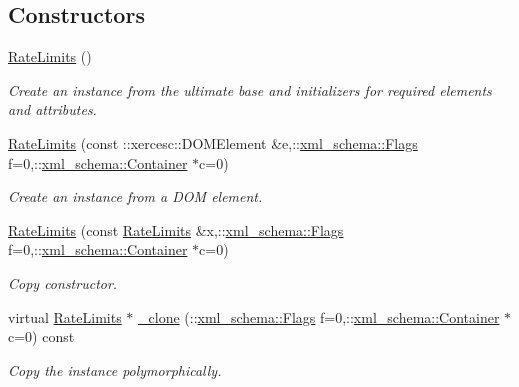 \subsection*{Constructors}
\begin{DoxyCompactItemize}
\item 
\hypertarget{classopenstack_1_1xml_1_1RateLimits_a8049d12bffabf9e47b02c86bde2fa540}{
\hyperlink{classopenstack_1_1xml_1_1RateLimits_a8049d12bffabf9e47b02c86bde2fa540}{RateLimits} ()}
\label{classopenstack_1_1xml_1_1RateLimits_a8049d12bffabf9e47b02c86bde2fa540}

\begin{DoxyCompactList}\small\item\em Create an instance from the ultimate base and initializers for required elements and attributes. \item\end{DoxyCompactList}\item 
\hyperlink{classopenstack_1_1xml_1_1RateLimits_a4547ecf1b92a698a730b5bb4e35c4564}{RateLimits} (const ::xercesc::DOMElement \&e,::\hyperlink{namespacexml__schema_affb4c227cbd9aa7453dd1dc5a1401943}{xml\_\-schema::Flags} f=0,::\hyperlink{namespacexml__schema_a333dea2213742aea47a37532dec4ec27}{xml\_\-schema::Container} $\ast$c=0)
\begin{DoxyCompactList}\small\item\em Create an instance from a DOM element. \item\end{DoxyCompactList}\item 
\hyperlink{classopenstack_1_1xml_1_1RateLimits_aa11864d4d45c735470871bf01b01ec88}{RateLimits} (const \hyperlink{classopenstack_1_1xml_1_1RateLimits}{RateLimits} \&x,::\hyperlink{namespacexml__schema_affb4c227cbd9aa7453dd1dc5a1401943}{xml\_\-schema::Flags} f=0,::\hyperlink{namespacexml__schema_a333dea2213742aea47a37532dec4ec27}{xml\_\-schema::Container} $\ast$c=0)
\begin{DoxyCompactList}\small\item\em Copy constructor. \item\end{DoxyCompactList}\item 
virtual \hyperlink{classopenstack_1_1xml_1_1RateLimits}{RateLimits} $\ast$ \hyperlink{classopenstack_1_1xml_1_1RateLimits_a4bc0af206771287f05f1a44ee6c34535}{\_\-clone} (::\hyperlink{namespacexml__schema_affb4c227cbd9aa7453dd1dc5a1401943}{xml\_\-schema::Flags} f=0,::\hyperlink{namespacexml__schema_a333dea2213742aea47a37532dec4ec27}{xml\_\-schema::Container} $\ast$c=0) const 
\begin{DoxyCompactList}\small\item\em Copy the instance polymorphically. \item\end{DoxyCompactList}\end{DoxyCompactItemize}


